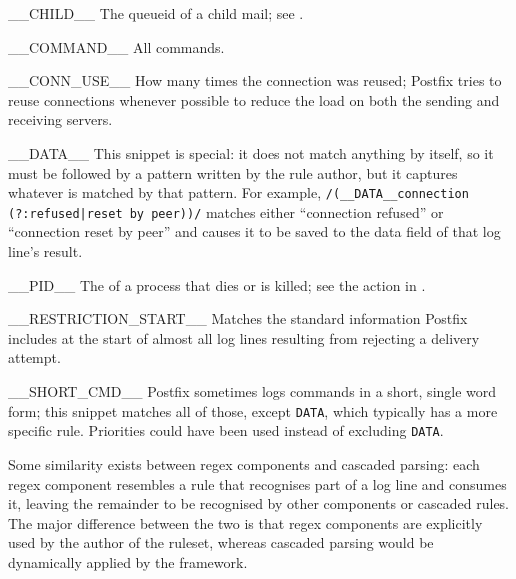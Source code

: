 \begin{eqlist}

    \squeezeitems{}

    \item [\_\_CHILD\_\_]  The queueid of a child mail; see
        .

    \item [\_\_COMMAND\_\_]  All  commands.

    \item [\_\_CONN\_USE\_\_]  How many times the connection was reused;
        Postfix tries to reuse connections whenever possible to reduce the
        load on both the sending and receiving servers.

    \item [\_\_DATA\_\_]  This snippet is special: it does not match
        anything by itself, so it must be followed by a pattern written by
        the rule author, but it captures whatever is matched by that
        pattern.  For example, \verb!/(__DATA__connection! \newline{}
        \tab{}\verb!(?:refused|reset by peer))/! matches either
        ``connection refused'' or ``connection reset by peer'' and causes
        it to be saved to the data field of that log line's result.

    \item [\_\_PID\_\_]  The  of a  process that
        dies or is killed; see the  action in
        .

    \item [\_\_RESTRICTION\_START\_\_]  Matches the standard information
        Postfix includes at the start of almost all log lines resulting
        from rejecting a delivery attempt.

    \item [\_\_SHORT\_CMD\_\_]  Postfix sometimes logs 
        commands in a short, single word form; this snippet matches all of
        those, except \texttt{DATA}, which typically has a more specific
        rule.  Priorities could have been used instead of excluding
        \texttt{DATA}.


\end{eqlist}

Some similarity exists between regex components and cascaded parsing: each
regex component resembles a rule that recognises part of a log line and
consumes it, leaving the remainder to be recognised by other components or
cascaded rules.  The major difference between the two is that regex
components are explicitly used by the author of the ruleset, whereas
cascaded parsing would be dynamically applied by the framework.

